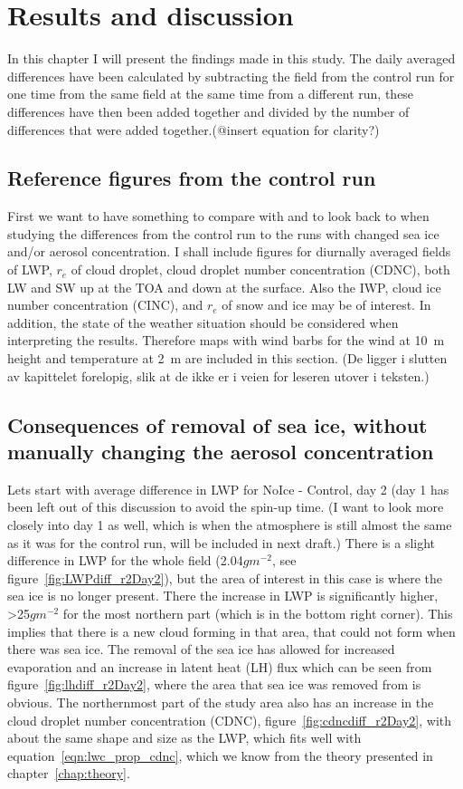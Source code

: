 \chapter{Results and discussion}
\label{chap:results}
In this chapter I will present the findings made in this study.  The daily averaged differences have been calculated by subtracting the field from the control run for one time from the same field at the same time from a different run, these differences have then been added together and divided by the number of differences that were added together.(@insert equation for clarity?)

\section{Reference figures from the control run}
First we want to have something to compare with and to look back to when studying the differences from the control run to the runs with changed sea ice and/or aerosol concentration. I shall include figures for diurnally averaged fields of LWP, $r_e$ of cloud droplet, cloud droplet number concentration (CDNC), both LW and SW up at the TOA and down at the surface. Also the IWP, cloud ice number concentration (CINC), and $r_e$ of snow and ice may be of interest. In addition, the state of the weather situation should be considered when interpreting the results. Therefore maps with wind barbs for the wind at 10~m height and temperature at 2~m are included in this section. (De ligger i slutten av kapittelet forelopig, slik at de ikke er i veien for leseren utover i teksten.)

\section{Consequences of removal of sea ice, without manually changing the aerosol concentration}
Lets start with average difference in LWP for NoIce - Control, day 2 (day 1 has been left out of this discussion to avoid the spin-up time. (I want to look more closely into day 1 as well, which is when the atmosphere is still almost the same as it was for the control run, will be included in next draft.) There is a slight difference in LWP for the whole field (2.04$gm^{-2}$, see figure~\ref{fig:LWPdiff_r2Day2}), but the area of interest in this case is where the sea ice is no longer present. There the increase in LWP is significantly higher, >25$gm^{-2}$ for the most northern part (which is in the bottom right corner). This implies that there is a new cloud forming in that area, that could not form when there was sea ice. The removal of the sea ice has allowed for increased evaporation and an increase in latent heat (LH) flux which can be seen from figure~\ref{fig:lhdiff_r2Day2}, where the area that sea ice was removed from is obvious. The northernmost part of the study area also has an increase in the cloud droplet number concentration (CDNC), figure~\ref{fig:cdncdiff_r2Day2}, with about the same shape and size as the LWP, which fits well with equation~\ref{eqn:lwc_prop_cdnc}, which we know from the theory presented in chapter~\ref{chap:theory}. 

